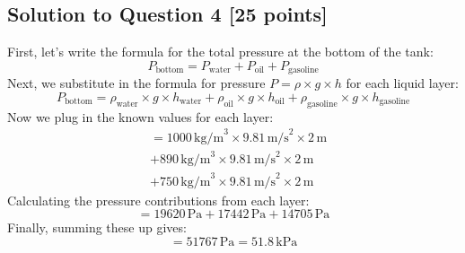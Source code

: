 \documentclass[12pt]{article}
\begin{document}
\subsection*{Solution to Question 4 [25 points]}

First, let's write the formula for the total pressure at the bottom of the tank:
\[
P_{\text{bottom}} = P_{\text{water}} + P_{\text{oil}} + P_{\text{gasoline}}
\]
Next, we substitute in the formula for pressure \( P = \rho \times g \times h \) for each liquid layer:
\[
P_{\text{bottom}} = \rho_{\text{water}} \times g \times h_{\text{water}} + \rho_{\text{oil}} \times g \times h_{\text{oil}} + \rho_{\text{gasoline}} \times g \times h_{\text{gasoline}}
\]
Now we plug in the known values for each layer:
\begin{align*}
&= 1000 \, \text{kg/m}^3 \times 9.81 \, \text{m/s}^2 \times 2 \, \text{m} \\
&+ 890 \, \text{kg/m}^3 \times 9.81 \, \text{m/s}^2 \times 2 \, \text{m} \\
&+ 750 \, \text{kg/m}^3 \times 9.81 \, \text{m/s}^2 \times 2 \, \text{m}
\end{align*}
Calculating the pressure contributions from each layer:
\[
= 19620 \, \text{Pa} + 17442 \, \text{Pa} + 14705 \, \text{Pa}
\]
Finally, summing these up gives:
\[
= 51767 \, \text{Pa} = 51.8 \, \text{kPa}
\]
\end{document}
